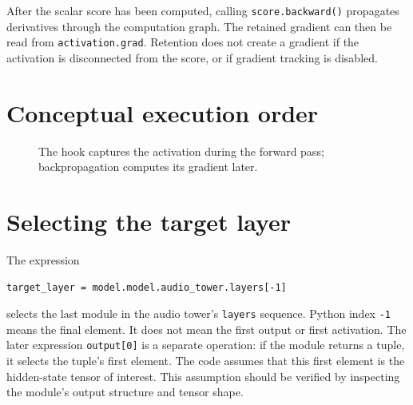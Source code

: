 \documentclass[11pt,a4paper]{article}
\begin{document}
After the scalar score has been computed, calling \texttt{score.backward()} propagates derivatives through the computation graph. The retained gradient can then be read from \texttt{activation.grad}. Retention does not create a gradient if the activation is disconnected from the score, or if gradient tracking is disabled.

\section{Conceptual execution order}
\begin{figure}[H]
\centering
{}
\caption{The hook captures the activation during the forward pass; backpropagation computes its gradient later.}
\end{figure}

\section{Selecting the target layer}
The expression
\begin{lstlisting}[style=python]
target_layer = model.model.audio_tower.layers[-1]
\end{lstlisting}
selects the last module in the audio tower's \texttt{layers} sequence. Python index \texttt{-1} means the final element. It does not mean the first output or first activation. The later expression \texttt{output[0]} is a separate operation: if the module returns a tuple, it selects the tuple's first element. The code assumes that this first element is the hidden-state tensor of interest. This assumption should be verified by inspecting the module's output structure and tensor shape.
\end{document}
